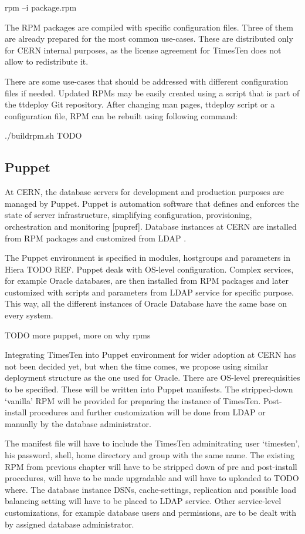 \documentclass[11pt, letterpaper]{article}            %
\begin{document}
                rpm –i  package.rpm

The RPM packages are compiled with specific configuration files. Three of them are already prepared for the most common use-cases. These are distributed only for CERN internal purposes, as the license agreement for TimesTen does not allow to redistribute it.

There are some use-cases that should be addressed with different configuration files if needed. Updated RPMs may be easily created using a script that is part of the ttdeploy Git repository. After changing man pages, ttdeploy script or a configuration file, RPM can be rebuilt using following command:

                ./buildrpm.sh TODO

\subsection{Puppet}

At CERN, the database servers for development and production purposes are managed by Puppet. Puppet is automation software that defines and enforces the state of server infrastructure, simplifying configuration, provisioning, orchestration and monitoring [pupref]. Database instances at CERN are installed from RPM packages and customized from LDAP .

The Puppet environment is specified in modules, hostgroups and parameters in Hiera TODO REF. Puppet deals with OS-level configuration. Complex services, for example Oracle databases, are then installed from RPM packages and later customized with scripts and parameters from LDAP service for specific purpose. This way, all the different instances of Oracle Database have the same base on every system.

TODO more puppet, more on why rpms

Integrating TimesTen into Puppet environment for wider adoption at CERN has not been decided yet, but when the time comes, we propose using similar deployment structure as the one used for Oracle. There are OS-level prerequisities to be specified. These will be written into Puppet manifests. The stripped-down ‘vanilla’ RPM will be provided for preparing the instance of TimesTen. Post-install procedures and further customization will be done from LDAP or manually by the database administrator.

The manifest file will have to include the TimesTen adminitrating user ‘timesten’, his password, shell, home directory and group with the same name. The existing RPM from previous chapter will have to be stripped down of pre and post-install procedures, will have to be made upgradable and will have to uploaded to TODO where. The database instance DSNs, cache-settings, replication and possible load balancing setting will have to be placed to LDAP service. Other service-level customizations, for example database users and permissions, are to be dealt with by assigned database administrator.
\end{document}
